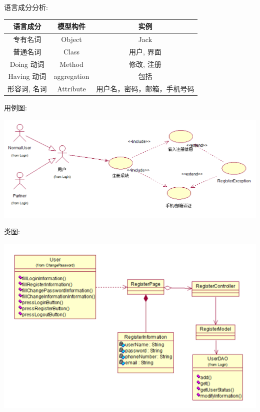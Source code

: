 \documentclass[11pt]{article}
\begin{document}
			语言成分分析:
			\begin{center}
			\begin{tabular}{|c|c|c|}
			\hline
			语言成分 & 模型构件 & 实例\\ \hline
			专有名词 & Object & Jack  \\ \hline
			普通名词 & Class & 用户, 界面 \\ \hline
			Doing 动词 & Method &  修改, 注册 \\ \hline
			Having 动词 & aggregation & 包括 \\ \hline
			形容词, 名词 & Attribute & 用户名，密码，邮箱，手机号码 \\ \hline
			\end{tabular}
			\end{center}
			
			用例图: 
			\begin{center}
			\includegraphics[scale=0.42]{注册_用例图.png}
			\end{center}

			类图: 
			\begin{center}
			\includegraphics[scale=0.42]{注册_类图.png}
			\end{center}
\end{document}
